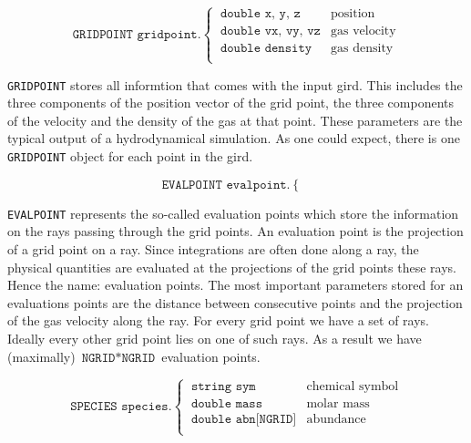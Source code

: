 \documentclass[]{article}
\begin{document}
\begin{equation}
\texttt{GRIDPOINT gridpoint.}
\begin{cases}
\ \texttt{double x, y, z} & \text{position}\\
\ \texttt{double vx, vy, vz} &  \text{gas velocity} \\
\ \texttt{double density} &  \text{gas density} \\
\end{cases}
\end{equation}

\texttt{GRIDPOINT} stores all informtion that comes with the input gird. This includes the three components of the position vector of the grid point, the three components of the velocity and the density of the gas at that point. These parameters are the typical output of a hydrodynamical simulation. As one could expect, there is one \texttt{GRIDPOINT} object for each point in the gird.

\begin{equation}
\texttt{EVALPOINT evalpoint.}
\begin{cases}

\end{cases}
\end{equation}

\texttt{EVALPOINT} represents the so-called evaluation points which store the information on the rays passing through the grid points.  An evaluation point is the projection of a grid point on a ray. Since integrations are often done along a ray, the physical quantities are evaluated at the projections of the grid points these rays. Hence the name: evaluation points. The most important parameters stored for an evaluations points are the distance between consecutive points and the projection of the gas velocity along the ray. For every grid point we have a set of rays. Ideally every other grid point lies on one of such rays. As a result we have (maximally) $\texttt{NGRID}*\texttt{NGRID}$ evaluation points.

\begin{equation}
\texttt{SPECIES species.}
\begin{cases}
\ \texttt{string sym} & \text{chemical symbol}\\
\ \texttt{double mass} & \text{molar mass} \\
\ \texttt{double abn[NGRID]} &  \text{abundance} \\
\end{cases}
\end{equation}
\end{document}
